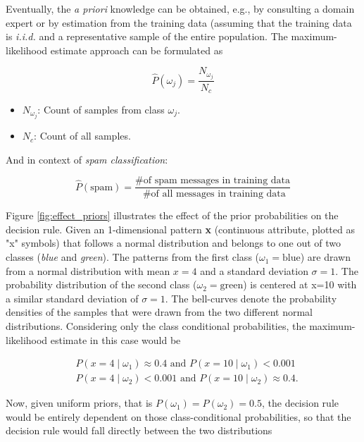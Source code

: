\documentclass{article}
\begin{document}
Eventually, the \emph{a priori} knowledge can be obtained, e.g., by consulting a domain expert or by estimation from the training data (assuming that the training data is \emph{i.i.d.} and a representative sample of the entire population. The maximum-likelihood estimate approach can be formulated as

\begin{equation} \hat{P}(\omega_j) = \frac{N_{\omega_j}}{N_c}  \end{equation}

\begin{itemize}
	\item $N_{\omega_j}$: Count of samples from class $\omega_j$.
	\item $N_c$: Count of all samples.
\end{itemize}

And in context of  \emph{spam classification}:


\begin{equation}\hat{P}(\text{spam}) = \frac{\text{\# of spam messages in training data}}{\text{ \# of all messages in training data}} \end{equation}


Figure \ref{fig:effect_priors} illustrates the effect of the prior probabilities on the decision rule. Given an 1-dimensional pattern \textbf{x} (continuous attribute, plotted as "x" symbols) that follows a normal distribution and belongs to one out of two classes (\emph{blue} and \emph{green}). The patterns from the first class ($\omega_1=\text{blue}$) are drawn from a normal distribution with mean  $x=4$ and a standard deviation $\sigma=1$. The probability distribution of the second class ($\omega_2=\text{green}$) is centered at x=10 with a similar standard deviation of $\sigma=1$. The bell-curves denote the probability densities of the samples that were drawn from the two different normal distributions. Considering only the class conditional probabilities, the maximum-likelihood estimate in this case would be  

\begin{equation} 
\begin{split}
&P(x=4 \mid \omega_1) \approx 0.4 \text{ and } P(x=10 \mid \omega_1) < 0.001\\
&P(x=4 \mid \omega_2) < 0.001 \text{ and } P(x=10 \mid \omega_2) \approx 0.4.
\end{split}
\end{equation} 


Now, given uniform priors, that is $P(\omega_1) = P(\omega_2) = 0.5$, the decision rule would be entirely dependent on those class-conditional probabilities, so that the decision rule would fall directly between the two distributions
\end{document}
